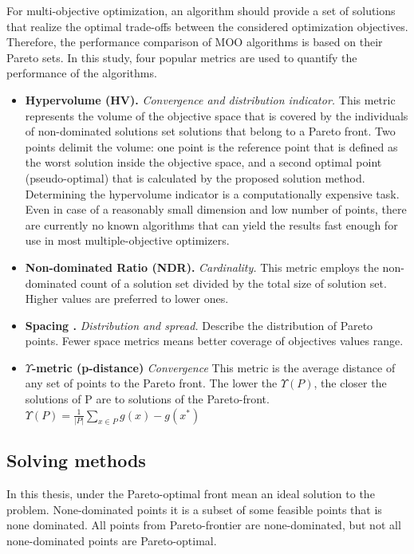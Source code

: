         For multi-objective optimization, an algorithm should provide a set of solutions that realize the optimal trade-offs between the considered optimization objectives. Therefore, the performance comparison of MOO algorithms is based on their Pareto sets. In this study, four popular metrics are used to quantify the performance of the algorithms.
        \begin{itemize}
            \item \textbf{Hypervolume (HV).}\cite{Zitzler2000ComparisonOM} \textit{Convergence and distribution indicator.}
            This metric represents the volume of the objective space that is covered by the individuals of non-dominated solutions set solutions that belong to a Pareto front. Two points delimit the volume: one point is the reference point that is defined as the worst solution inside the objective space, and a second optimal point (pseudo-optimal) that is calculated by the proposed solution method. Determining the hypervolume indicator is a computationally expensive task. Even in case of a reasonably small dimension and low number of points, there are currently no known algorithms that can yield the results fast enough for use in most multiple-objective optimizers.
            \item \textbf{Non-dominated Ratio (NDR).} \textit{Cardinality.} This metric employs the non-dominated count of a solution set divided by the total size of solution set. Higher values are preferred to lower ones.
            \item \textbf{Spacing \cite{Schott1995FaultTD}.} \textit{Distribution and spread.} Describe the distribution of Pareto points. Fewer space metrics means better coverage of objectives values range. 
            \item \textbf{$\Upsilon$-metric (p-distance)}\cite{Martens13} \textit{Convergence} This metric is the average distance of any set of points to the Pareto front. The lower the $\Upsilon (P)$, the closer the solutions of P are to solutions of the Pareto-front. $\Upsilon(P) = \frac{1}{|P|}\sum_{x\in P}g(x)-g(x^*)$
            
        \end{itemize}
 
        \subsection{Solving methods}
        In this thesis, under the Pareto-optimal front mean an ideal solution to the problem. None-dominated points it is a subset of some feasible points that is none dominated. All points from Pareto-frontier are none-dominated, but not all none-dominated points are Pareto-optimal.

